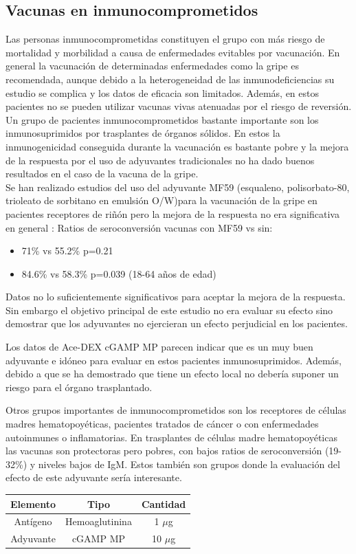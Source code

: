 \documentclass[a4paper,11pt]{article}
\begin{document}
\subsection{Vacunas en inmunocomprometidos}
Las personas inmunocomprometidas constituyen el grupo con más riesgo de mortalidad y morbilidad a causa de enfermedades evitables por vacunación. En general la vacunación de determinadas enfermedades como la gripe es recomendada, aunque debido a la heterogeneidad de las inmunodeficiencias su estudio se complica y los datos de eficacia son limitados. \cite{inmunodef} Además, en estos pacientes no se pueden utilizar vacunas vivas atenuadas por el riesgo de reversión. 
\\Un grupo de pacientes inmunocomprometidos bastante importante son los inmunosuprimidos por trasplantes de órganos sólidos. En estos la inmunogenicidad conseguida durante la vacunación es bastante pobre y la mejora de la respuesta por el uso de adyuvantes tradicionales no ha dado buenos resultados en el caso de la vacuna de la gripe. \cite{infla}
\\Se han realizado estudios del uso del adyuvante MF59 (esqualeno, polisorbato-80, trioleato de sorbitano en emulsión O/W)para la vacunación de la gripe en pacientes receptores de riñón pero la mejora de la respuesta no era significativa en general \cite{inmunodef2}:
Ratios de seroconversión vacunas con MF59 vs sin:
\begin{itemize}
	\item 71\% vs 55.2\% p=0.21
	\item 84.6\% vs 58.3\% p=0.039 (18-64 años de edad)
\end{itemize}
Datos no lo suficientemente significativos para aceptar la mejora de la respuesta. Sin embargo el objetivo principal de este estudio no era evaluar su efecto sino demostrar que los adyuvantes no ejercieran un efecto perjudicial en los pacientes.

Los datos de Ace-DEX cGAMP MP parecen indicar que es un muy buen adyuvante e idóneo para evaluar en estos pacientes inmunosuprimidos. Además, debido a que se ha demostrado que tiene un efecto local no debería suponer un riesgo para el órgano trasplantado. 

Otros grupos importantes de inmunocomprometidos son los receptores de células madres hematopoyéticas, pacientes tratados de cáncer o con enfermedades autoinmunes o inflamatorias. En trasplantes de células madre hematopoyéticas las vacunas son protectoras pero pobres, con bajos ratios de seroconversión (19-32\%) y niveles bajos de IgM. Estos también son grupos donde la evaluación del efecto de este adyuvante sería interesante.
\begin{center}
\begin{tabular}{|c|c|c|}
	\hline
	Elemento&Tipo&Cantidad\\
	\hline
	Antígeno&Hemoaglutinina&1 $\mu$g\\
	\hline
	Adyuvante&cGAMP MP& 10 $\mu$g\\
	\hline
	
\end{tabular}
\end{center}
\end{document}
